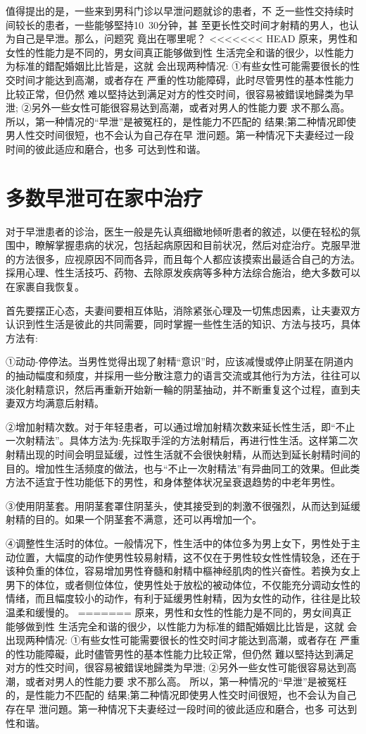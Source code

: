 \documentclass[12pt,UTF8]{ctexbook}
\begin{document}
值得提出的是，一些来到男科门诊以早泄问题就诊的患者，不
乏一些性交持续时间较长的患者，一些能够堅持10~30分钟，甚
至更长性交时间才射精的男人，也认为自己是早泄。那么，问题究
竟出在哪里呢？
<<<<<<< HEAD
原来，男性和女性的性能力是不同的，男女间真正能够做到性
生活完全和谐的很少，以性能力为标准的錯配婚姻比比皆是，这就
会出现两种情况:
①有些女性可能需要很长的性交时间才能达到高潮，或者存在
严重的性功能障碍，此时尽管男性的基本性能力比较正常，但仍然
难以堅持达到满足对方的性交时间，很容易被錯误地歸类为早泄;
②另外一些女性可能很容易达到高潮，或者对男人的性能力要
求不那么高。
所以，第一种情况的“早泄”是被冤枉的，是性能力不匹配的
结果;第二种情况即使男人性交时间很短，也不会认为自己存在早
泄问题。第一种情况下夫妻经过一段时间的彼此适应和磨合，也多
可达到性和谐。

\section{多数早泄可在家中治疗}

对于早泄患者的诊治，医生一般是先认真细緻地倾听患者的敘述，以便在轻松的氛围中，瞭解掌握患病的状况，包括起病原因和目前状况，然后对症治疗。克服早泄的方法很多，应视原因不同而各异，而且每个人都应该摸索出最适合自己的方法。採用心理、性生活技巧、药物、去除原发疾病等多种方法综合施治，绝大多数可以在家裹自我恢复。

首先要摆正心态，夫妻间要相互体贴，消除紧张心理及一切焦虑因素，让夫妻双方认识到性生活是彼此的共同需要，同时掌握一些性生活的知识、方法与技巧，具体方法有:

①动动-停停法。当男性觉得出现了射精“意识”时，应该减慢或停止阴茎在阴道内的抽动幅度和频度，并採用一些分散注意力的语言交流或其他行为方法，往往可以淡化射精意识，然后再重新开始新一輪的阴茎抽动，并不断重复这个过程，直到夫妻双方均满意后射精。

②增加射精次数。对于年轻患者，可以通过增加射精次数来延长性生活，即“不止一次射精法”。具体方法为:先採取手淫的方法射精后，再进行性生活。这样第二次射精出现的时间会明显延缓，过性生活就不会很快射精，从而达到延长射精时间的目的。增加性生活频度的做法，也与“不止一次射精法”有异曲同工的效果。但此类方法不适宜于性功能低下的男性，和身体整体状况呈衰退趋势的中老年男性。

③使用阴茎套。用阴茎套罩住阴茎头，使其接受到的刺激不很强烈，从而达到延缓射精的目的。如果一个阴茎套不满意，还可以再增加一个。

④调整性生活时的体位。一般情况下，性生活中的体位多为男上女下，男性处于主动位置，大幅度的动作使男性较易射精，这不仅在于男性较女性性情较急，还在于该种负重的体位，容易增加男性脊髓和射精中樞神经肌肉的性兴奋性。若换为女上男下的体位，或者侧位体位，使男性处于放松的被动体位，不仅能充分调动女性的情绪，而且幅度较小的动作，有利于延缓男性射精，因为女性的动作，往往是比较温柔和缓慢的。
=======
原来，男性和女性的性能力是不同的，男女间真正能够做到性
生活完全和谐的很少，以性能力为标准的錯配婚姻比比皆是，这就
会出现两种情况:
①有些女性可能需要很长的性交时间才能达到高潮，或者存在
严重的性功能障礙，此时儘管男性的基本性能力比较正常，但仍然
難以堅持达到满足对方的性交时间，很容易被錯误地歸类为早泄;
②另外一些女性可能很容易达到高潮，或者对男人的性能力要
求不那么高。
所以，第一种情况的“早泄”是被冤枉的，是性能力不匹配的
结果;第二种情况即使男人性交时间很短，也不会认为自己存在早
泄问題。第一种情况下夫妻经过一段时间的彼此适应和磨合，也多
可达到性和谐。
\end{document}
